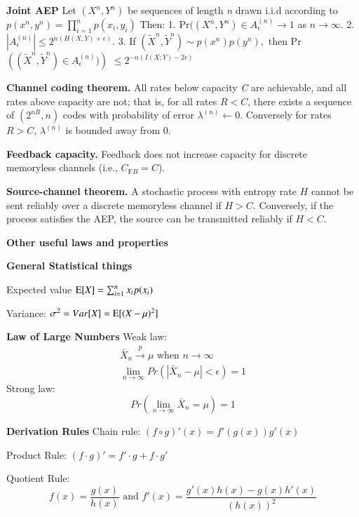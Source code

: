 \documentclass[10pt]{article}
\DeclareMathOperator*{\E}{\mbox{\text{E}}}
\begin{document}
\begin{tiny}
\begin{multicols}{3}
{\bf Joint AEP} Let $(X^{n}, Y^{n})$ be sequences of length {\it n} drawn i.i.d according to $p(x^{n},y^{n})=\prod_{i=1}^{n}p(x_{i},y_{i})$ Then: 1. Pr$((X^{n},Y^{n}) \in A_{\epsilon}^{(n)}\rightarrow 1$ as $n\rightarrow \infty$. 2. $|A_{\epsilon}^{(n)}|\leq 2^{n(H(X,Y)+\epsilon)}$. 3. If $(\tilde{X}^{n}, \tilde{Y}^{n})\sim p(x^{n})p(y^{n}),$ then Pr$\left( (\tilde{X}^{n},\tilde{Y}^{n})\in A_{\epsilon}^{(n)} )\right) $ $\leq 2^{-n(I(X;Y)-2\epsilon)}$

{\bf Channel coding theorem.} All rates below capacity {\it C} are achievable, and all rates above capacity are not; that is, for all rates $R<C$, there exists a sequence of $(2^{nR},n)$ codes with probability of error $\lambda^{(n)}\leftarrow 0$. Conversely for rates $R>C$, $\lambda^{(n)}$ is bounded away from 0.

{\bf Feedback capacity.} Feedback does not increase capacity for discrete memoryless channels (i.e., $C_{\text{F}B} = C$).

{\bf Source-channel theorem.} A stochastic process with entropy rate $H$ cannot be sent reliably over a discrete memoryless channel if $H > C$. Conversely, if the process satisfies the AEP, the source can be transmitted reliably if $H<C$.



\textbf{\scriptsize Other useful laws and properties}

{\bf General Statistical things} 

Expected value $\E[X]=\sum_{i=1}^n x_i p(x_i)$

Variance: $\sigma^2 = Var[X] = \E [ (X-\mu)^2]$

{\bf Law of Large Numbers} Weak law:
\begin{eqnarray*}
\bar{X}_n\overset{p}\rightarrow \mu \text{ when } n \rightarrow \infty\\
\lim_{n\rightarrow \infty} Pr\left(|\bar{X}_n-\mu| < \epsilon \right) = 1
\end{eqnarray*}
Strong law:
\begin{equation}
Pr\left(\lim_{n\rightarrow \infty} \bar{X}_n = \mu \right) = 1
\end{equation}

{\bf Derivation Rules} Chain rule: $(f \circ g)'(x)=f'(g(x))g'(x)$

Product Rule: $(f\cdot g)' = f' \cdot g + f \cdot g'$

Quotient Rule: \[f(x)=\frac{g(x)}{h(x)}\text{ and }f'(x)=\frac{g'(x)h(x)-g(x)h'(x)}{\left(h(x)\right)^2}\]


\end{multicols}
\end{tiny}
\end{document}
